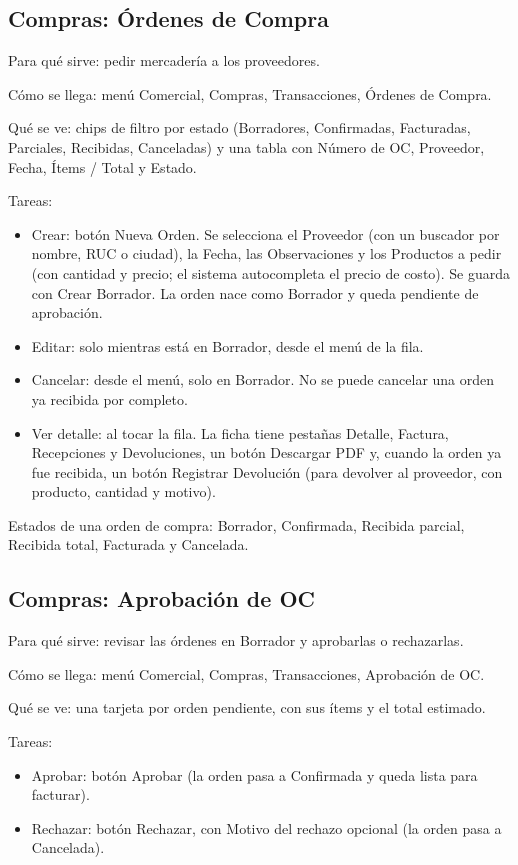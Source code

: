 \subsection{Compras: Órdenes de Compra}
\label{sec:mu-compras-ordenes}

Para qué sirve: pedir mercadería a los proveedores.

Cómo se llega: menú Comercial, Compras, Transacciones, Órdenes de Compra.

Qué se ve: chips de filtro por estado (Borradores, Confirmadas, Facturadas, Parciales, Recibidas, Canceladas) y una tabla con Número de OC, Proveedor, Fecha, Ítems / Total y Estado.

Tareas:
\begin{itemize}
  \item Crear: botón Nueva Orden. Se selecciona el Proveedor (con un buscador por nombre, RUC o ciudad), la Fecha, las Observaciones y los Productos a pedir (con cantidad y precio; el sistema autocompleta el precio de costo). Se guarda con Crear Borrador. La orden nace como Borrador y queda pendiente de aprobación.
  \item Editar: solo mientras está en Borrador, desde el menú de la fila.
  \item Cancelar: desde el menú, solo en Borrador. No se puede cancelar una orden ya recibida por completo.
  \item Ver detalle: al tocar la fila. La ficha tiene pestañas Detalle, Factura, Recepciones y Devoluciones, un botón Descargar PDF y, cuando la orden ya fue recibida, un botón Registrar Devolución (para devolver al proveedor, con producto, cantidad y motivo).
\end{itemize}

Estados de una orden de compra: Borrador, Confirmada, Recibida parcial, Recibida total, Facturada y Cancelada.

\subsection{Compras: Aprobación de OC}
\label{sec:mu-compras-aprobacion}

Para qué sirve: revisar las órdenes en Borrador y aprobarlas o rechazarlas.

Cómo se llega: menú Comercial, Compras, Transacciones, Aprobación de OC.

Qué se ve: una tarjeta por orden pendiente, con sus ítems y el total estimado.

Tareas:
\begin{itemize}
  \item Aprobar: botón Aprobar (la orden pasa a Confirmada y queda lista para facturar).
  \item Rechazar: botón Rechazar, con Motivo del rechazo opcional (la orden pasa a Cancelada).
\end{itemize}

